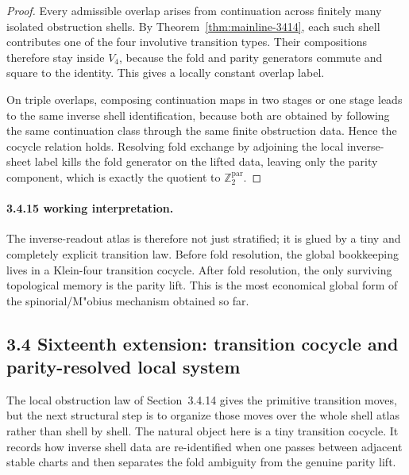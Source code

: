 \documentclass[12pt,a4paper]{article}
\begin{document}
\begin{proof}
Every admissible overlap arises from continuation across finitely many isolated obstruction shells. By Theorem~\ref{thm:mainline-3414}, each such shell contributes one of the four involutive transition types. Their compositions therefore stay inside $V_4$, because the fold and parity generators commute and square to the identity. This gives a locally constant overlap label.

On triple overlaps, composing continuation maps in two stages or one stage leads to the same inverse shell identification, because both are obtained by following the same continuation class through the same finite obstruction data. Hence the cocycle relation holds. Resolving fold exchange by adjoining the local inverse-sheet label kills the fold generator on the lifted data, leaving only the parity component, which is exactly the quotient to $\mathbb Z_2^{\mathrm{par}}$.
\end{proof}

\paragraph{3.4.15 working interpretation.}
The inverse-readout atlas is therefore not just stratified; it is glued by a tiny and completely explicit transition law. Before fold resolution, the global bookkeeping lives in a Klein-four transition cocycle. After fold resolution, the only surviving topological memory is the parity lift. This is the most economical global form of the spinorial/M"obius mechanism obtained so far.




\subsection*{3.4 Sixteenth extension: transition cocycle and parity-resolved local system}
The local obstruction law of Section~3.4.14 gives the primitive transition moves, but the next structural step is to organize those moves over the whole shell atlas rather than shell by shell. The natural object here is a tiny transition cocycle. It records how inverse shell data are re-identified when one passes between adjacent stable charts and then separates the fold ambiguity from the genuine parity lift.
\end{document}
